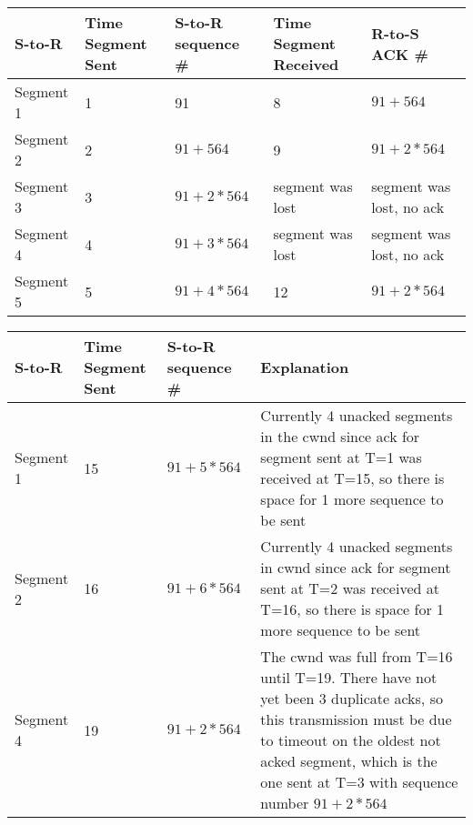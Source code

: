 \documentclass[letter,10pt]{article}
\begin{document}
\begin{table}[h!]
	\centering
	\begin{tabular}{|l|l|l|l|l|}
		\hline
		S-to-R & Time Segment Sent & S-to-R sequence \# & Time Segment Received & R-to-S ACK \# \\ \hline
		Segment 1          & 1                 & 91                            & 8                     & $91 + 564$               \\ \hline
		Segment 2          & 2                 & $91+564$                      & 9                     & $91 + 2 * 564$           \\ \hline
		Segment 3          & 3                 & $91+2*564$                    & segment was lost     & segment was lost, no ack \\ \hline
		Segment 4          & 4                 & $91+3*564$                    & segment was lost     & segment was lost, no ack \\ \hline
		Segment 5          & 5                 & $91+4*564$                    & 12                    & $91 + 2 * 564$           \\ \hline
	\end{tabular}
\end{table}

\begin{table} [h!]
	\centering
	\begin{tabular}{| l | l | l | p{8cm}|}
		\hline
		S-to-R & Time Segment Sent & S-to-R sequence \# & Explanation                                                                                                                                                                                                                 \\ \hline
		Segment 1          & 15                & $91+5*564$                    & Currently 4 unacked segments in the cwnd since ack for segment sent at T=1 was received at T=15, so there is space for 1 more sequence to be sent                                                                           \\ \hline
		Segment 2          & 16                & $91+6*564$                    & Currently 4 unacked segments in cwnd since ack for segment sent at T=2 was received at T=16, so there is space for 1 more sequence to be sent                                                                               \\ \hline
		Segment 4          & 19                & $91+2*564$                    & The cwnd was full from T=16 until T=19. There have not yet been 3 duplicate acks, so this transmission must be due to timeout on the oldest not acked segment, which is the one sent at T=3 with sequence number $91+2*564$ \\ \hline
	\end{tabular}
\end{table}
\end{document}
